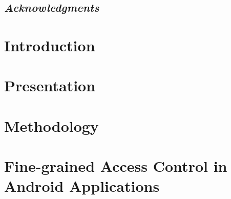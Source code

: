 \documentclass[12pt,a4paper,twoside,openright,oldfontcommands]{memoir}
\begin{document}



\pagestyle{empty}
\section*{{\normalsize \textit{Acknowledgments}}}
\label{chap:acknowledgments}

\cleardoublepage


\pagestyle{empty}

\cleardoublepage


\tableofcontents*
\cleardoublepage


\setcounter{page}{1}
\pagestyle{intro}

\chapter*{Introduction}
\label{chap:abstract}


\chapter[Presentation]{Presentation}
\label{chap:intro}
\pagestyle{afterintro}


\chapter[Methodology]{Methodology}
\label{chap:methodology}
\pagestyle{afterintro}


\chapter{Fine-grained Access Control in Android Applications}
\label{chap:seapp}
\pagestyle{afterintro}

\end{document}
